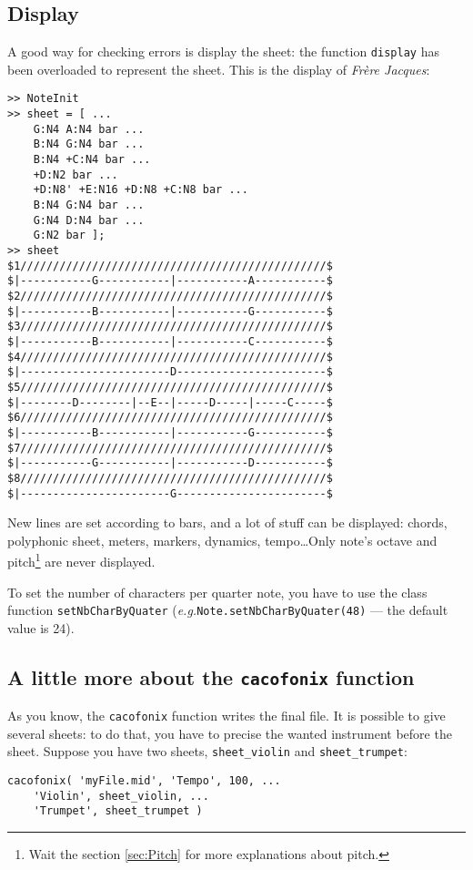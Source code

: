 \documentclass{article}
\newcommand{\frerejaques}{\emph{Fr\`ere Jacques}\xspace}
\newcommand{\eg}{\emph{e.g.}\xspace}
\begin{document}
\subsection{Display}

A good way for checking errors is display the sheet: the function \lstinline!display! has been overloaded to represent the sheet. This is the display of \frerejaques:
\begin{lstlisting}
>> NoteInit
>> sheet = [ ...
	G:N4 A:N4 bar ...
	B:N4 G:N4 bar ...
	B:N4 +C:N4 bar ...
	+D:N2 bar ...
	+D:N8' +E:N16 +D:N8 +C:N8 bar ...
	B:N4 G:N4 bar ...
	G:N4 D:N4 bar ...
	G:N2 bar ];
>> sheet
$1///////////////////////////////////////////////$
$|-----------G-----------|-----------A-----------$
$2///////////////////////////////////////////////$
$|-----------B-----------|-----------G-----------$
$3///////////////////////////////////////////////$
$|-----------B-----------|-----------C-----------$
$4///////////////////////////////////////////////$
$|-----------------------D-----------------------$
$5///////////////////////////////////////////////$
$|--------D--------|--E--|-----D-----|-----C-----$
$6///////////////////////////////////////////////$
$|-----------B-----------|-----------G-----------$
$7///////////////////////////////////////////////$
$|-----------G-----------|-----------D-----------$
$8///////////////////////////////////////////////$
$|-----------------------G-----------------------$
\end{lstlisting}

New lines are set according to bars, and a lot of stuff can be displayed: chords, polyphonic sheet, meters, markers, dynamics, tempo\dots Only note's octave and pitch\footnote{Wait the section \ref{sec:Pitch} for more explanations about pitch.} are never displayed.

To set the number of characters per quarter note, you have to use the class function \lstinline!setNbCharByQuater! (\eg \lstinline!Note.setNbCharByQuater(48)! --- the default value is 24).

\subsection{A little more about the \lstinline!cacofonix! function}

As you know, the \lstinline!cacofonix! function writes the final file. It is possible to give several sheets: to do that, you have to precise the wanted instrument before the sheet. Suppose you have two sheets, \lstinline!sheet_violin! and \lstinline!sheet_trumpet!:
\begin{lstlisting}
cacofonix( 'myFile.mid', 'Tempo', 100, ...
	'Violin', sheet_violin, ...
	'Trumpet', sheet_trumpet )
\end{lstlisting}
\end{document}
